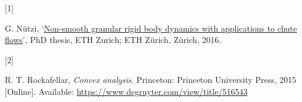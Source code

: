 \documentclass[
  british,
  12pt,
  paper=a4,
  twoside,
  titlepage=true,
  openright,
  abstract=on,
  toc=listofnumbered,
  numbers=noenddot,
  chapterprefix=true,
  headings=optiontohead,
  svgnames,
  dvipsnames]{scrreprt}
\newlength{\cslhangindent}
\newlength{\csllabelwidth}
\newlength{\cslentryspacingunit} %
\newenvironment{CSLReferences}[2] %
 {%
  \setlength{\parindent}{0pt}
  \ifodd #1
  \let\oldpar\par
  \def\par{\hangindent=\cslhangindent\oldpar}
  \fi
  \setlength{\parskip}{#2\cslentryspacingunit}
 }%
 {}
\newcommand{\CSLLeftMargin}[1]{\parbox[t]{\csllabelwidth}{#1}}
\newcommand{\CSLRightInline}[1]{\parbox[t]{\linewidth - \csllabelwidth}{#1}\break}
\begin{document}
\hypertarget{refs}{}
\begin{CSLReferences}{0}{0}
\leavevmode{}%
\CSLLeftMargin{{[}1{]} }
\CSLRightInline{G. Nützi,
{‘\href{https://doi.org/10.3929/ethz-a-010662262}{Non-smooth granular
rigid body dynamics with applications to chute flows}’}, PhD thesis, ETH
Zurich; ETH Zürich, Zürich, 2016. }

\leavevmode{}%
\CSLLeftMargin{{[}2{]} }
\CSLRightInline{R. T. Rockafellar, \emph{Convex analysis}. Princeton:
Princeton University Press, 2015 {[}Online{]}. Available:
\url{https://www.degruyter.com/view/title/516543}}

\end{CSLReferences}
\end{document}
